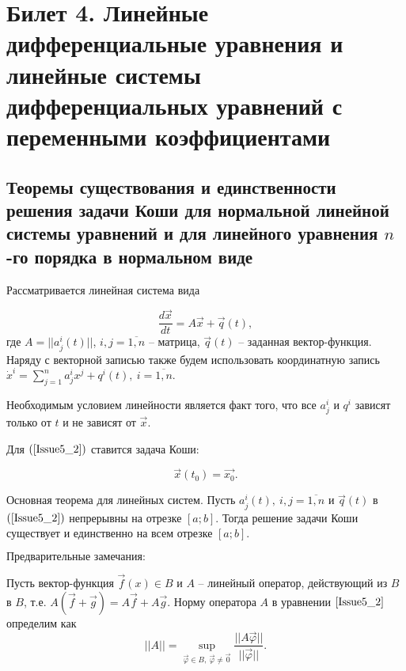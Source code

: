 \section{Билет 4. Линейные дифференциальные уравнения и линейные системы дифференциальных уравнений с переменными коэффициентами}

\subsection{Теоремы существования и единственности решения задачи Коши для нормальной линейной системы уравнений и
для линейного уравнения $n$-го порядка в нормальном виде}

Рассматривается линейная система вида

\begin{equation}
	\frac{d\overrightarrow{x}}{dt} = A\overrightarrow{x} + \overrightarrow{q}(t),
	\label{Issue5_2}
\end{equation}
где $A = ||a_j^i(t)||$, $i, j = \overline{1, n}$ -- матрица, $\overrightarrow{q}(t)$ -- заданная вектор-функция. Наряду с векторной записью также будем использовать координатную запись $\dot{x}^i = \sum\limits_{j = 1}^{n} a_j^i x^j + q^i(t),\ i = \overline{1, n}$.

$\textbf{Необходимым условием линейности}$ является факт того, что все $a_j^i$ и $q^i$ зависят только от $t$ и не зависят от $\overrightarrow{x}$.

Для $(\ref{Issue5_2})$ ставится задача Коши:

\[ \overrightarrow{x}(t_0) = \overrightarrow{x_0}.\]

\begin{theorem}
	$\textbf{Основная теорема для линейных систем.}$ Пусть $a_j^i(t),\ i, j = \overline{1, n}$ и $\overrightarrow{q}(t)$ в $(\ref{Issue5_2})$ непрерывны на отрезке $[a;b]$. Тогда решение задачи Коши существует и единственно на всем отрезке $[a;b].$
	\label{4_1_Cauchy}
\end{theorem}

$\textbf{Предварительные замечания:}$

Пусть вектор-функция $\overrightarrow{f}(x) \in B$ и $A$ -- линейный оператор, действующий из $B$ в $B$, т.е. $A(\overrightarrow{f} + \overrightarrow{g}) = A\overrightarrow{f} + A\overrightarrow{g}$.
Норму оператора $A$ в уравнении $\eqref{Issue5_2}$ определим как
\[ ||A|| =  \sup\limits_{\overrightarrow{\varphi} \in B,\ \overrightarrow{\varphi} \neq \overrightarrow{0}} \frac{||A\overrightarrow{\varphi}||}{||\overrightarrow{\varphi}||}. \]

